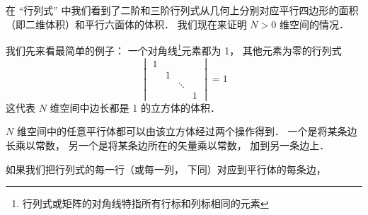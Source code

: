 

在 “行列式” 中我们看到了二阶和三阶行列式从几何上分别对应平行四边形的面积（即二维体积）和平行六面体的体积． 我们现在来证明 $N > 0$ 维空间的情况．

我们先来看最简单的例子： 一个对角线\footnote{行列式或矩阵的对角线特指所有行标和列标相同的元素}元素都为 1， 其他元素为零的行列式
\begin{equation}
\begin{vmatrix}
1 & & &\\
  & 1 & &\\
  &  & \ddots &\\
  & & & 1
\end{vmatrix} = 1
\end{equation}
这代表 $N$ 维空间中边长都是 1 的立方体的体积．

$N$ 维空间中的任意平行体都可以由该立方体经过两个操作得到． 一个是将某条边长乘以常数， 另一个是将某条边所在的矢量乘以常数， 加到另一条边上．

如果我们把行列式的每一行（或每一列， 下同）对应到平行体的每条边， 
